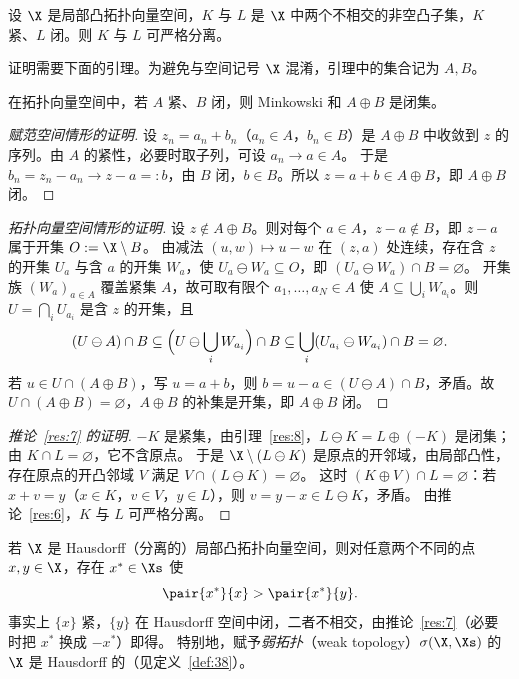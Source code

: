 \begin{corollary}
\label{res:7}
设 $\X$ 是局部凸拓扑向量空间，$K$ 与 $L$ 是 $\X$ 中两个不相交的非空凸子集，$K$ 紧、$L$ 闭。则 $K$ 与 $L$ 可严格分离。
\end{corollary}

证明需要下面的引理。为避免与空间记号 $\X$ 混淆，引理中的集合记为 $A,B$。

\begin{lemma}
\label{res:8}
在拓扑向量空间中，若 $A$ 紧、$B$ 闭，则 Minkowski 和 $A\oplus B$ 是闭集。
\end{lemma}

\begin{proof}[赋范空间情形的证明]
设 $z_n=a_n+b_n$（$a_n\in A$，$b_n\in B$）是 $A\oplus B$ 中收敛到 $z$ 的序列。由 $A$ 的紧性，必要时取子列，可设 $a_n\to a\in A$。
于是 $b_n=z_n-a_n\to z-a=:b$，由 $B$ 闭，$b\in B$。所以 $z=a+b\in A\oplus B$，即 $A\oplus B$ 闭。
\end{proof}

\begin{proof}[拓扑向量空间情形的证明]
设 $z\notin A\oplus B$。则对每个 $a\in A$，$z-a\notin B$，即 $z-a$ 属于开集 $O:=\X\setminus B$。
由减法 $(u,w)\mapsto u-w$ 在 $(z,a)$ 处连续，存在含 $z$ 的开集 $U_a$ 与含 $a$ 的开集 $W_a$，使 $U_a\ominus W_a\subseteq O$，即 $(U_a\ominus W_a)\cap B=\varnothing$。
开集族 $(W_a)_{a\in A}$ 覆盖紧集 $A$，故可取有限个 $a_1,\dots,a_N\in A$ 使 $A\subseteq\bigcup_iW_{a_i}$。则 $U=\bigcap_iU_{a_i}$ 是含 $z$ 的开集，且
\[
  (U\ominus A)\cap B\subseteq\Bigl(U\ominus\bigcup_iW_{a_i}\Bigr)\cap B\subseteq\bigcup_i(U_{a_i}\ominus W_{a_i})\cap B=\varnothing .
\]
若 $u\in U\cap(A\oplus B)$，写 $u=a+b$，则 $b=u-a\in(U\ominus A)\cap B$，矛盾。故 $U\cap(A\oplus B)=\varnothing$，$A\oplus B$ 的补集是开集，即 $A\oplus B$ 闭。
\end{proof}

\begin{proof}[推论~\ref{res:7} 的证明]
$-K$ 是紧集，由引理~\ref{res:8}，$L\ominus K=L\oplus(-K)$ 是闭集；由 $K\cap L=\varnothing$，它不含原点。
于是 $\X\setminus(L\ominus K)$ 是原点的开邻域，由局部凸性，存在原点的开凸邻域 $V$ 满足 $V\cap(L\ominus K)=\varnothing$。
这时 $(K\oplus V)\cap L=\varnothing$：若 $x+v=y$（$x\in K$，$v\in V$，$y\in L$），则 $v=y-x\in L\ominus K$，矛盾。
由推论~\ref{res:6}，$K$ 与 $L$ 可严格分离。
\end{proof}

\begin{remark}[点的分离]
\label{rem:1}
若 $\X$ 是 Hausdorff（分离的）局部凸拓扑向量空间，则对任意两个不同的点 $x,y\in\X$，存在 $x^*\in\Xs$ 使
\[
  \pair{x^*}{x}>\pair{x^*}{y}.
\]
事实上 $\{x\}$ 紧，$\{y\}$ 在 Hausdorff 空间中闭，二者不相交，由推论~\ref{res:7}（必要时把 $x^*$ 换成 $-x^*$）即得。
特别地，赋予\emph{弱拓扑}（weak topology）$\sigma(\X,\Xs)$ 的 $\X$ 是 Hausdorff 的（见定义~\ref{def:38}）。
\end{remark}

